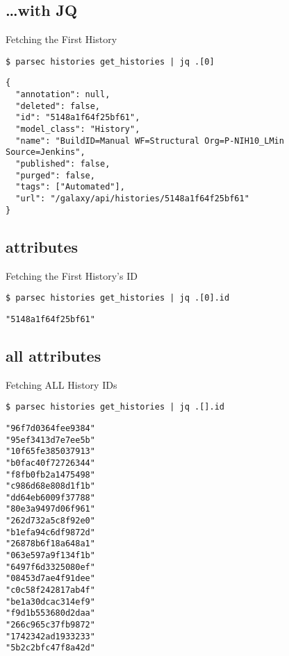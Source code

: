 \documentclass[12pt]{phage3slides} %
\begin{document}
\subsection{\ldots{}with JQ}
\begin{frame}[fragile,t]{Fetching the First History}
\begin{verbatim}
$ parsec histories get_histories | jq .[0]
\end{verbatim}
\begin{verbatim}
{
  "annotation": null,
  "deleted": false,
  "id": "5148a1f64f25bf61",
  "model_class": "History",
  "name": "BuildID=Manual WF=Structural Org=P-NIH10_LMin Source=Jenkins",
  "published": false,
  "purged": false,
  "tags": ["Automated"],
  "url": "/galaxy/api/histories/5148a1f64f25bf61"
}
\end{verbatim}
\end{frame}


\subsection{attributes}
\begin{frame}[fragile,t]{Fetching the First History's ID}
\begin{verbatim}
$ parsec histories get_histories | jq .[0].id
\end{verbatim}
\begin{verbatim}
"5148a1f64f25bf61"
\end{verbatim}
\end{frame}


\subsection{all attributes}
\begin{frame}[fragile,t]{Fetching ALL History IDs}
\begin{verbatim}
$ parsec histories get_histories | jq .[].id
\end{verbatim}
\begin{verbatim}
"96f7d0364fee9384"
"95ef3413d7e7ee5b"
"10f65fe385037913"
"b0fac40f72726344"
"f8fb0fb2a1475498"
"c986d68e808d1f1b"
"dd64eb6009f37788"
"80e3a9497d06f961"
"262d732a5c8f92e0"
"b1efa94c6df9872d"
"26878b6f18a648a1"
"063e597a9f134f1b"
"6497f6d3325080ef"
"08453d7ae4f91dee"
"c0c58f242817ab4f"
"be1a30dcac314ef9"
"f9d1b553680d2daa"
"266c965c37fb9872"
"1742342ad1933233"
"5b2c2bfc47f8a42d"
\end{verbatim}
\end{frame}
\end{document}
